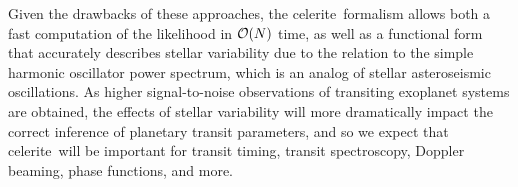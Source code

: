 \documentclass[manuscript, letterpaper]{aastex6}
\makeatletter
\let\origsection\section
\renewcommand\section{\@ifstar{\starsection}{\nostarsection}}
\newcommand\nostarsection[1]{\sectionprelude\origsection{#1}}
\newcommand\starsection[1]{\sectionprelude\origsection*{#1}}
\newcommand\sectionprelude{\vspace{1em}}
\newcommand{\project}[1]{\textsf{#1}}
\newcommand{\celerite}{\project{celerite}}
\makeatother
\begin{document}
Given the drawbacks of these approaches, the \celerite\ formalism allows both a fast
computation of the likelihood in ${\cal O}(N)$ time, as well as a functional form
that accurately describes stellar variability due to the relation to the simple
harmonic oscillator power spectrum, which is an analog of stellar asteroseismic
oscillations.  As higher signal-to-noise observations of transiting exoplanet systems
are obtained, the effects of stellar variability will more dramatically impact the
correct inference of planetary transit parameters, and so we expect that \celerite\
will be important for transit timing, transit spectroscopy, Doppler beaming,
phase functions, and more.

%
%
\end{document}

